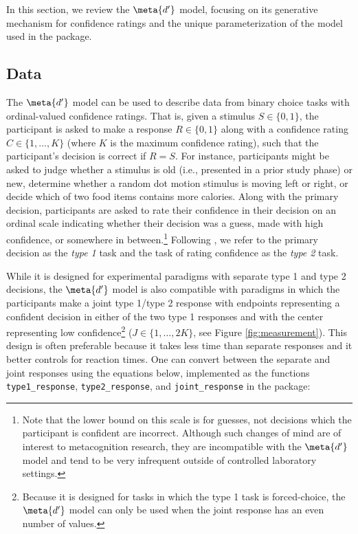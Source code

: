 In this section, we review the $\meta{d'}$ model, focusing on its generative mechanism for confidence ratings and the unique parameterization of the model used in the \hmetad{} package.

\subsection{Data}
The $\meta{d'}$ model can be used to describe data from binary choice tasks with ordinal-valued confidence ratings. That is, given a stimulus $S \in \{0, 1\}$, the participant is asked to make a response $R \in \{0, 1\}$ along with a confidence rating $C \in \{1, \ldots, K\}$ (where $K$ is the maximum confidence rating), such that the participant's decision is correct if $R = S$. For instance, participants might be asked to judge whether a stimulus is old (i.e., presented in a prior study phase) or new, determine whether a random dot motion stimulus is moving left or right, or decide which of two food items contains more calories. Along with the primary decision, participants are asked to rate their confidence in their decision on an ordinal scale indicating whether their decision was a guess, made with high confidence, or somewhere in between.\footnote{Note that the lower bound on this scale is for guesses, not decisions which the participant is confident are incorrect. Although such changes of mind are of interest to metacognition research, they are incompatible with the $\meta{d'}$ model and tend to be very infrequent outside of controlled laboratory settings.} Following \textcite{clarke1959}, we refer to the primary decision as the \emph{type 1} task and the task of rating confidence as the \emph{type 2} task. 

While it is designed for experimental paradigms with separate type 1 and type 2 decisions, the $\meta{d'}$ model is also compatible with paradigms in which the participants make a joint type 1/type 2 response with endpoints representing a confident decision in either of the two type 1 responses and with the center representing low confidence\footnote{Because it is designed for tasks in which the type 1 task is forced-choice, the $\meta{d'}$ model can only be used when the joint response has an even number of values.} ($J \in \{1, \ldots, 2K\}$, see Figure \ref{fig:measurement}). This design is often preferable because it takes less time than separate responses and it better controls for reaction times. One can convert between the separate and joint responses using the equations below, implemented as the functions \texttt{type1\_response}, \texttt{type2\_response}, and \texttt{joint\_response} in the \hmetad{} package:

